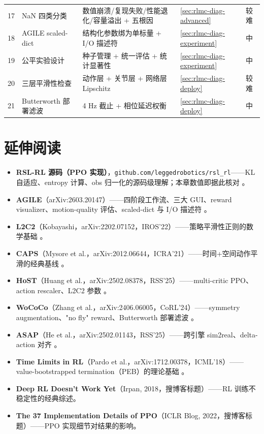 \begin{table}[H]
\begin{tabular}{p{0.7cm}p{4.6cm}p{5.0cm}p{1.8cm}p{1.4cm}}
17 & NaN 四类分类 & 数值崩溃/复现失败/性能退化/容量溢出 + 五根因 & \cref{sec:rlmc-diag-advanced} & 较难 \\
18 & AGILE scaled-dict & 结构化参数绑为单标量 + I/O 描述符 & \cref{sec:rlmc-diag-experiment} & 中 \\
19 & 公平实验设计 & 种子管理 + 统一评估 + 统计显著性 & \cref{sec:rlmc-diag-experiment} & 中 \\
20 & 三层平滑性检查 & 动作层 + 关节层 + 网络层 Lipschitz & \cref{sec:rlmc-diag-deploy} & 较难 \\
21 & Butterworth 部署滤波 & 4 Hz 截止 + 相位延迟权衡 & \cref{sec:rlmc-diag-deploy} & 中 \\
\hline
\end{tabular}
\end{table}

\section*{延伸阅读}
\label{sec:rlmc-diag-further}

\begin{itemize}
  \item \textbf{RSL-RL 源码（PPO 实现）}，\verb|github.com/leggedrobotics/rsl_rl|——KL 自适应、entropy 计算、obs 归一化的源码级理解；本章数值即据此核对 \cite{schwarke2025rslrl}。
  \item \textbf{AGILE}（arXiv:2603.20147）——四阶段工作流、三大 GUI、reward visualizer、motion-quality 评估、scaled-dict 与 I/O 描述符 \cite{nvidia2026agile}。
  \item \textbf{L2C2}（Kobayashi，arXiv:2202.07152，IROS'22）——策略平滑性正则的数学基础 \cite{kobayashi2022l2c2}。
  \item \textbf{CAPS}（Mysore et al.，arXiv:2012.06644，ICRA'21）——时间+空间动作平滑的经典基线 \cite{mysore2021caps}。
  \item \textbf{HoST}（Huang et al.，arXiv:2502.08378，RSS'25）——multi-critic PPO、action rescaler、L2C2 参数 \cite{huang2025host}。
  \item \textbf{WoCoCo}（Zhang et al.，arXiv:2406.06005，CoRL'24）——symmetry augmentation、"no fly" reward、Butterworth 部署滤波 \cite{zhang2024wococo}。
  \item \textbf{ASAP}（He et al.，arXiv:2502.01143，RSS'25）——跨引擎 sim2real、delta-action 对齐 \cite{he2025asap}。
  \item \textbf{Time Limits in RL}（Pardo et al.，arXiv:1712.00378，ICML'18）——value-bootstrapped termination（PEB）的理论基础 \cite{pardo2018timelimits}。
  \item \textbf{Deep RL Doesn't Work Yet}（Irpan, 2018，搜博客标题）——RL 训练不稳定性的经典综述。
  \item \textbf{The 37 Implementation Details of PPO}（ICLR Blog, 2022，搜博客标题）——PPO 实现细节对结果的影响。
\end{itemize}

